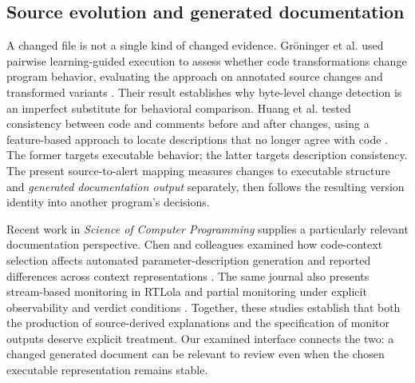 \documentclass[preprint,11pt]{elsarticle}
\begin{document}
\subsection{Source evolution and generated documentation}
A changed file is not a single kind of changed evidence. Gr\"{o}ninger et al. used pairwise learning-guided execution to assess whether code transformations change program behavior, evaluating the approach on annotated source changes and transformed variants \cite{groninger2025changeguard}. Their result establishes why byte-level change detection is an imperfect substitute for behavioral comparison. Huang et al. tested consistency between code and comments before and after changes, using a feature-based approach to locate descriptions that no longer agree with code \cite{chen2024cocc}. The former targets executable behavior; the latter targets description consistency. The present source-to-alert mapping measures changes to executable structure and \emph{generated documentation output} separately, then follows the resulting version identity into another program's decisions.

Recent work in \emph{Science of Computer Programming} supplies a particularly relevant documentation perspective. Chen and colleagues examined how code-context selection affects automated parameter-description generation and reported differences across context representations \cite{chen2026context}. The same journal also presents stream-based monitoring in RTLola and partial monitoring under explicit observability and verdict conditions \cite{baumeister2026rtlola,ferrando2025partial}. Together, these studies establish that both the production of source-derived explanations and the specification of monitor outputs deserve explicit treatment. Our examined interface connects the two: a changed generated document can be relevant to review even when the chosen executable representation remains stable.
\end{document}
